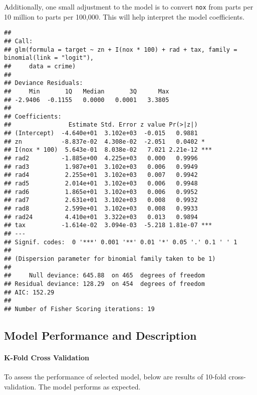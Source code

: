 \documentclass[]{article}
\let\oldparagraph\paragraph
\renewcommand{\paragraph}[1]{\oldparagraph{#1}\mbox{}}
\begin{document}
Additionally, one small adjustment to the model is to convert
\texttt{nox} from parts per 10 million to parts per 100,000. This will
help interpret the model coefficients.

\begin{verbatim}
## 
## Call:
## glm(formula = target ~ zn + I(nox * 100) + rad + tax, family = binomial(link = "logit"), 
##     data = crime)
## 
## Deviance Residuals: 
##     Min       1Q   Median       3Q      Max  
## -2.9406  -0.1155   0.0000   0.0001   3.3805  
## 
## Coefficients:
##                Estimate Std. Error z value Pr(>|z|)    
## (Intercept)  -4.640e+01  3.102e+03  -0.015   0.9881    
## zn           -8.837e-02  4.308e-02  -2.051   0.0402 *  
## I(nox * 100)  5.643e-01  8.038e-02   7.021 2.21e-12 ***
## rad2         -1.885e+00  4.225e+03   0.000   0.9996    
## rad3          1.987e+01  3.102e+03   0.006   0.9949    
## rad4          2.255e+01  3.102e+03   0.007   0.9942    
## rad5          2.014e+01  3.102e+03   0.006   0.9948    
## rad6          1.865e+01  3.102e+03   0.006   0.9952    
## rad7          2.631e+01  3.102e+03   0.008   0.9932    
## rad8          2.599e+01  3.102e+03   0.008   0.9933    
## rad24         4.410e+01  3.322e+03   0.013   0.9894    
## tax          -1.614e-02  3.094e-03  -5.218 1.81e-07 ***
## ---
## Signif. codes:  0 '***' 0.001 '**' 0.01 '*' 0.05 '.' 0.1 ' ' 1
## 
## (Dispersion parameter for binomial family taken to be 1)
## 
##     Null deviance: 645.88  on 465  degrees of freedom
## Residual deviance: 128.29  on 454  degrees of freedom
## AIC: 152.29
## 
## Number of Fisher Scoring iterations: 19
\end{verbatim}

\hypertarget{model-performance-and-description}{%
\subsection{Model Performance and
Description}\label{model-performance-and-description}}

\hypertarget{k-fold-cross-validation}{%
\paragraph{K-Fold Cross Validation}\label{k-fold-cross-validation}}

To assess the performance of selected model, below are results of
10-fold cross-validation. The model performs as expected.
\end{document}
